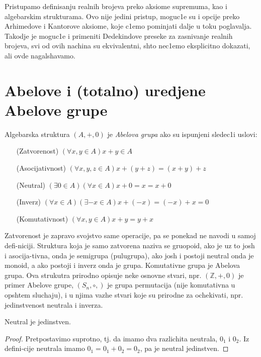 \documentclass[../main.tex]{subfiles}
\begin{document}
    Pristupamo definisanju realnih brojeva preko aksiome supremuma, kao i algebarskim strukturama. Ovo nije jedini pristup, moguc1e su i opcije preko Arhimedove i Kantorove aksiome, koje c1emo pominjati dalje u toku poglavalja. Takodje je moguc1e i primeniti Dedekindove preseke za zasnivanje realnih brojeva, svi od ovih nachina su ekvivalentni, shto nec1emo eksplicitno dokazati, ali ovde nagalshavamo.

\section{Abelove i (totalno) uredjene Abelove grupe}

    {\de Algebarska struktura $(A,+,0)$ je \textit{Abelova grupa} ako su ispunjeni sledec1i uslovi:

\begin{itemize}[itemindent=6em]
    \item[(Zatvorenost)] $(\forall x,y\in A) x+y\in A$  
    \item[(Asocijativnost)] $(\forall x,y,z \in A) x+(y+z)=(x+y)+z$ 
    \item[(Neutral)] $(\exists 0 \in A) (\forall x \in A) x+0=x=x+0$ 
    \item[(Inverz)] $(\forall x\in A) (\exists -x\in A) x+(-x)=(-x)+x=0$  
    \item[(Komutativnost)]  $(\forall x,y\in A)x+y=y+x$  
\end{itemize}}

    Zatvorenost je zapravo svojstvo same operacije, pa se ponekad ne navodi u samoj defi-niciji. Struktura koja je samo zatvorena naziva se gruopoid, ako je uz to josh i asocija-tivna, onda je semigrupa (pulugrupa), ako josh i postoji neutral onda je monoid, a ako postoji i inverz onda je grupa. Komutativne grupa je Abelova grupa. Ova strukutra prirodno opisuje neke osnovne stvari, npr. $(\mathbb{Z},+,0)$ je primer Abelove grupe, $(S_n,\circ,)$ je grupa permutacija (nije komutativna u opshtem sluchaju), i u njima vazhe stvari koje su prirodne za ochekivati, npr. jedinstvenost neutrala i inverza.    

    {\tvr Neutral je jedinstven.}

    \begin{proof} 
        Pretpostavimo suprotno, tj. da imamo dva razlichita neutrala, $0_1$ i $0_2$. Iz defini-cije neutrala imamo $0_1=0_1+0_2=0_2$, pa je neutral jedinstven.\end{proof}
\end{document}
